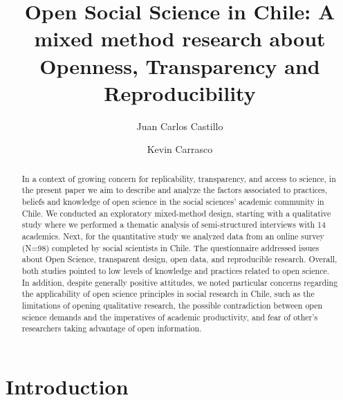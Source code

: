 \documentclass[
  letterpaper,
]{article}
\title{Open Social Science in Chile: A mixed method research about
Openness, Transparency and Reproducibility}
\author{Juan Carlos Castillo \and Kevin Carrasco}
\date{}
\renewcommand*\contentsname{Table of contents}
\newcommand\contentsname{Table of contents}
\begin{document}
\maketitle
\begin{abstract}
In a context of growing concern for replicability, transparency, and
access to science, in the present paper we aim to describe and analyze
the factors associated to practices, beliefs and knowledge of open
science in the social sciences' academic community in Chile. We
conducted an exploratory mixed-method design, starting with a
qualitative study where we performed a thematic analysis of
semi-structured interviews with 14 academics. Next, for the quantitative
study we analyzed data from an online survey (N=98) completed by social
scientists in Chile. The questionnaire addressed issues about Open
Science, transparent design, open data, and reproducible research.
Overall, both studies pointed to low levels of knowledge and practices
related to open science. In addition, despite generally positive
attitudes, we noted particular concerns regarding the applicability of
open science principles in social research in Chile, such as the
limitations of opening qualitative research, the possible contradiction
between open science demands and the imperatives of academic
productivity, and fear of other's researchers taking advantage of open
information.
\end{abstract}

\renewcommand*\contentsname{Table of contents}
{
\hypersetup{linkcolor=}
\setcounter{tocdepth}{3}
\tableofcontents
}

\section{Introduction}\label{introduction}
\end{document}
